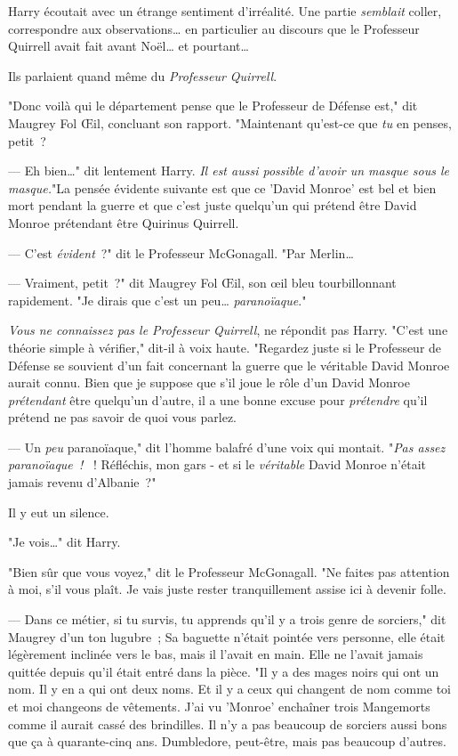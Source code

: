 Harry écoutait avec un étrange sentiment d'irréalité. Une partie \emph{semblait} coller, correspondre aux observations… en particulier au discours que le Professeur Quirrell avait fait avant Noël… et pourtant…

Ils parlaient quand même du \emph{Professeur Quirrell}.

"Donc voilà qui le département pense que le Professeur de Défense est," dit Maugrey Fol Œil, concluant son rapport. "Maintenant qu'est-ce que \emph{tu} en penses, petit~?

--- Eh bien…" dit lentement Harry. \emph{Il est aussi possible d'avoir un masque sous le masque.}"La pensée évidente suivante est que ce 'David Monroe' est bel et bien mort pendant la guerre et que c'est juste quelqu'un qui prétend être David Monroe prétendant être Quirinus Quirrell.

--- C'est \emph{évident}~?" dit le Professeur McGonagall. "Par Merlin…

--- Vraiment, petit~?" dit Maugrey Fol Œil, son œil bleu tourbillonnant rapidement. "Je dirais que c'est un peu… \emph{paranoïaque}."

\emph{Vous ne connaissez pas le Professeur Quirrell}, ne répondit pas Harry. "C'est une théorie simple à vérifier," dit-il à voix haute. "Regardez juste si le Professeur de Défense se souvient d'un fait concernant la guerre que le véritable David Monroe aurait connu. Bien que je suppose que s'il joue le rôle d'un David Monroe \emph{prétendant} être quelqu'un d'autre, il a une bonne excuse pour \emph{prétendre} qu'il prétend ne pas savoir de quoi vous parlez.

--- Un \emph{peu} paranoïaque," dit l'homme balafré d'une voix qui montait. "\emph{Pas assez paranoïaque~! }~! Réfléchis, mon gars - et si le \emph{véritable} David Monroe n'était jamais revenu d'Albanie~?"

Il y eut un silence.

"Je vois…" dit Harry.

"Bien sûr que vous voyez," dit le Professeur McGonagall. "Ne faites pas attention à moi, s'il vous plaît. Je vais juste rester tranquillement assise ici à devenir folle.

--- Dans ce métier, si tu survis, tu apprends qu'il y a trois genre de sorciers," dit Maugrey d'un ton lugubre~; Sa baguette n'était pointée vers personne, elle était légèrement inclinée vers le bas, mais il l'avait en main. Elle ne l'avait jamais quittée depuis qu'il était entré dans la pièce. "Il y a des mages noirs qui ont un nom. Il y en a qui ont deux noms. Et il y a ceux qui changent de nom comme toi et moi changeons de vêtements. J'ai vu 'Monroe' enchaîner trois Mangemorts comme il aurait cassé des brindilles. Il n'y a pas beaucoup de sorciers aussi bons que ça à quarante-cinq ans. Dumbledore, peut-être, mais pas beaucoup d'autres.

